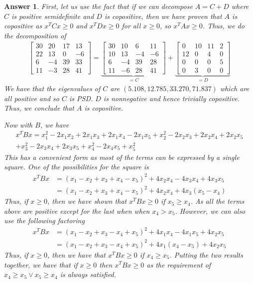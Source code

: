\documentclass[12pt]{article}
\theoremstyle{colon}
\newtheorem*{answer}{Answer}
\begin{document}
\begin{answer}
  First, let us use the fact that if we can decompose $A = C + D$ where $C$ is positive semidefinite and $D$ is copositive, then we have proven that $A$ is copositive as $x^T C x \geq 0$ and $x^T D x \geq 0$ for all $x \geq 0$, so $x^T A x \geq 0$. Thus, we do the decomposition of
  \begin{gather*}
    \begin{bmatrix}
      30 & 20 & 17 & 13 \\
      22 & 13 & 0 & -6 \\
      6 & -4 & 39 & 33 \\
      11 & -3 & 28 & 41
    \end{bmatrix} = \underbrace{\begin{bmatrix}
      30 & 10 & 6 & 11 \\
      10 & 13 & -4 & -6 \\
      6 & -4 & 39 & 28 \\
      11 & -6 & 28 & 41
    \end{bmatrix}}_{= C} + \underbrace{\begin{bmatrix}
      0 & 10 & 11 & 2 \\
      12 & 0 & 4 & 0 \\
      0 & 0 & 0 & 5 \\
      0 & 3 & 0 & 0
    \end{bmatrix}}_{= D}
  \end{gather*}
  We have that the eigenvalues of $C$ are $(5.108, 12.785, 33.270, 71.837)$ which are all positive and so $C$ is PSD. $D$ is nonnegative and hence trivially copositive. Thus, we conclude that $A$ is copositive.

  Now with $B$, we have
  \begin{gather*}
    x^T B x = x_1^2 -2 x_1 x_2 + 2 x_1 x_3 + 2 x_1 x_4 -2 x_1 x_5 + x_2^2 -2 x_2 x_3 + 2 x_2 x_4 + 2 x_2 x_5 \\
    + x_3^2 - 2 x_3 x_4 + 2 x_3 x_5 + x_4^2 - 2 x_4 x_5 + x_5^2
  \end{gather*}
  This has a convenient form as most of the terms can be expressed by a single square. One of the possibilities for the square is
  \begin{align*}
    x^T B x &= (x_1 - x_2 + x_3 + x_4 - x_5)^2 + 4x_2 x_4 - 4x_3 x_4 + 4x_3 x_5 \\
    &= (x_1 - x_2 + x_3 + x_4 - x_5)^2 + 4x_2 x_4 + 4x_3 (x_5 - x_4)
  \end{align*}
  Thus, if $x \geq 0$, then we have shown that $x^T B x \geq 0$ if $x_5 \geq x_4$. As all the terms above are positive except for the last when when $x_4 > x_5$. However, we can also use the following factoring
  \begin{align*}
    x^T B x &= (x_1 - x_2 + x_3 - x_4 + x_5)^2 + 4x_1 x_4 -4x_1 x_5 + 4x_2 x_5 \\
    &= (x_1 - x_2 + x_3 - x_4 + x_5)^2 + 4x_1 (x_4 - x_5) + 4x_2 x_5
  \end{align*}
  Thus, if $x \geq 0$, then we have that $x^T B x \geq 0$ if $x_4 \geq x_5$. Putting the two results together, we have that if $x \geq 0$ then $x^T B x \geq 0$ as the requirement of $x_4 \geq x_5 \lor x_5 \geq x_4$ is always satisfied.
\end{answer}
\end{document}
